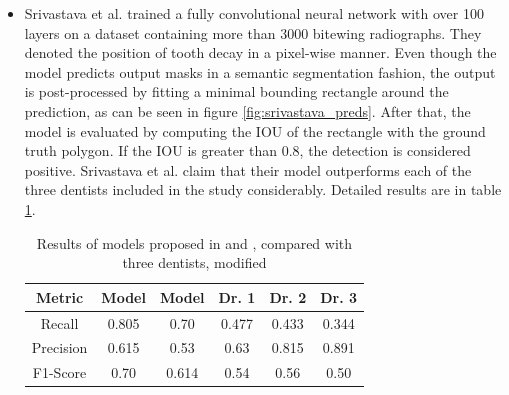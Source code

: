 \begin{itemize}
    \item{Srivastava et al. \cite{Srivastava2017}} trained a fully convolutional neural network with over 100 layers on a dataset containing more than 3000 bitewing radiographs. They denoted the position of tooth decay in a pixel-wise manner. Even though the model predicts output masks in a semantic segmentation fashion, the output is post-processed by fitting a minimal bounding rectangle around the prediction, as can be seen in figure \ref{fig:srivastava_preds}. After that, the model is evaluated by computing the IOU of the rectangle with the ground truth polygon. If the IOU is greater than 0.8, the detection is considered positive. Srivastava et al. claim that their model outperforms each of the three dentists included in the study considerably. Detailed results are in table \ref{tab:srivastava_results}.

          \begin{table}
              \centering
              \begin{tabular}{c||c|c|c|c|c}
                  Metric    & Model \cite{Srivastava2017} & Model \cite{Kumar2018} & Dr. 1 & Dr. 2 & Dr. 3 \\ \hline
                  Recall    & 0.805                       & 0.70                   & 0.477 & 0.433 & 0.344 \\ \hline
                  Precision & 0.615                       & 0.53                   & 0.63  & 0.815 & 0.891 \\ \hline
                  F1-Score  & 0.70                        & 0.614                  & 0.54  & 0.56  & 0.50
              \end{tabular}
              \caption{Results of models proposed in \cite{Srivastava2017} and \cite{Kumar2018}, compared with three dentists, modified}
              \label{tab:srivastava_results}
          \end{table}


\end{itemize}
